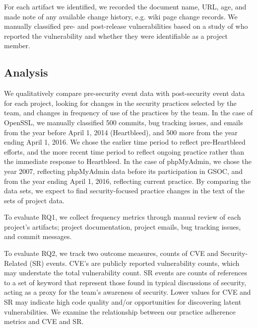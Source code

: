 For each artifact we identified, we recorded the document name, URL, age, and made note of any available change history, e.g. wiki page change records. We manually classified pre- and post-release vulnerabilities based on a study of who reported the vulnerability and whether they were identifiable as a project member.

\subsection{Analysis}

We qualitatively compare pre-security event data with post-security event data for each project, looking for changes in the security practices selected by the team, and changes in frequency of use of the practices by the team. In the case of OpenSSL, we manually classified 500 commits, bug tracking issues, and emails from the year before April 1, 2014 (Heartbleed), and 500 more from the year ending April 1, 2016.  We chose the earlier time period to reflect pre-Heartbleed efforts, and the more recent time period to reflect ongoing practice rather than the immediate response to Heartbleed. In the case of phpMyAdmin, we chose the year 2007, reflecting phpMyAdmin data before its participation in GSOC, and from the year ending April 1, 2016, reflecting current practice. By comparing the data sets, we expect to find security-focused practice changes in the text of the sets of project data.

To evaluate RQ1, we collect frequency metrics through manual review of each project’s artifacts; project documentation, project emails, bug tracking issues, and commit messages.  

To evaluate RQ2, we track two outcome measures, counts of CVE and Security-Related (SR) events. CVE's are publicly reported vulnerability counts, which may understate the total vulnerability count.  SR events are counts of references to a set of keyword that represent those found in typical discussions of security, acting as a proxy for the team's awareness of security. Lower values for CVE and SR may indicate high code quality and/or opportunities for discovering latent vulnerabilities. We examine the relationship between our practice adherence metrics and CVE and SR.
